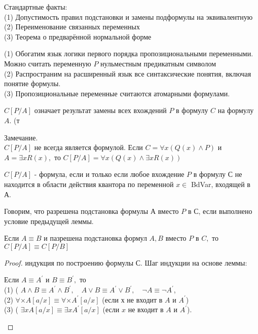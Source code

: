 Стандартные факты:\\
(1) Допустимость правил подстановки и замены подформулы
на эквивалентную\\
(2) Переименование связанных переменных\\
(3) Теорема о предварённой нормальной форме
\vskip 0.2in

(1) Обогатим язык логики первого порядка пропозициональными переменными. Можно считать переменную $P$ нульместным предикатным символом\\
(2) Распространим на расширенный язык все синтаксические понятия, включая понятие формулы.\\
(3) Пропозициональные переменные считаются атомарными формулами.
\vskip 0.2in

\begin{defn}
$C[P / A]$ означает результат замены всех вхождений $P$ в формулу $C$ на формулу $A .$ (т
\end{defn}
Замечание.\\
$C[P / A]$ не всегда является формулой. Если $C=\forall x(Q(x) \wedge P)$ и $A=\exists x R(x),$ то $C[P / A]=\forall x(Q(x) \wedge \exists x R(x))$
\vskip 0.2in

\begin{lem}
$C[P / A]$ - формула, если и только если любое вхождение $P$ в формулу С не находится в области действия квантора по переменной $x \in$ BdVar, входящей в А.
\end{lem}
\begin{defn}
Говорим, что разрешена подстановка формулы А вместо $P$ в С, если выполнено условие предыдущей леммы.
\end{defn}

\begin{theo}
Если $A \equiv B$ и пазрешена подстановка формул $A, B$ вместо $P$ в $C,$ то $C[P / A] \equiv C[P / B]$
\end{theo}
\begin{proof}
индукция по построению формулы С. Шаг индукции на основе леммы:
\begin{lem}
Если $A \equiv A^{\prime}$ и $B \equiv B^{\prime},$ то\\
(1) ( $A \wedge B \equiv A^{\prime} \wedge B^{\prime}, \quad A \vee B \equiv A^{\prime} \vee B^{\prime}, \quad \neg A \equiv \neg A^{\prime}$,\\
(2) $\forall \times A[a / x] \equiv \forall \times A^{\prime}[a / x]$ (если $х$ не входит в $A$ и $A^{\prime}$)\\
(3) ( $\exists x A[a / x] \equiv \exists x A^{\prime}[a / x]$ (если $x$ не входит в $A$ и $A^{\prime}$).\\
\end{lem}
\end{proof}

